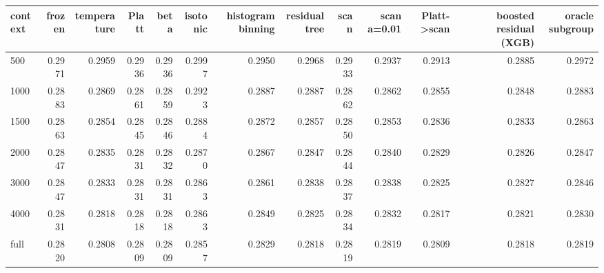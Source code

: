\begin{tabular}{lrrrrrrrrrrrr}
\toprule
context & frozen & temperature & Platt & beta & isotonic & histogram binning & residual tree & scan & scan a=0.01 & Platt->scan & boosted residual (XGB) & oracle subgroup \\
\midrule
500 & 0.2971 & 0.2959 & 0.2936 & 0.2936 & 0.2997 & 0.2950 & 0.2968 & 0.2933 & 0.2937 & 0.2913 & 0.2885 & 0.2972 \\
1000 & 0.2883 & 0.2869 & 0.2861 & 0.2859 & 0.2923 & 0.2887 & 0.2887 & 0.2862 & 0.2862 & 0.2855 & 0.2848 & 0.2883 \\
1500 & 0.2863 & 0.2854 & 0.2845 & 0.2846 & 0.2884 & 0.2872 & 0.2857 & 0.2850 & 0.2853 & 0.2836 & 0.2833 & 0.2863 \\
2000 & 0.2847 & 0.2835 & 0.2831 & 0.2832 & 0.2870 & 0.2867 & 0.2847 & 0.2844 & 0.2840 & 0.2829 & 0.2826 & 0.2847 \\
3000 & 0.2847 & 0.2833 & 0.2831 & 0.2831 & 0.2863 & 0.2861 & 0.2838 & 0.2837 & 0.2838 & 0.2825 & 0.2827 & 0.2846 \\
4000 & 0.2831 & 0.2818 & 0.2818 & 0.2818 & 0.2863 & 0.2849 & 0.2825 & 0.2834 & 0.2832 & 0.2817 & 0.2821 & 0.2830 \\
full & 0.2820 & 0.2808 & 0.2809 & 0.2809 & 0.2857 & 0.2829 & 0.2818 & 0.2819 & 0.2819 & 0.2809 & 0.2818 & 0.2819 \\
\bottomrule
\end{tabular}
